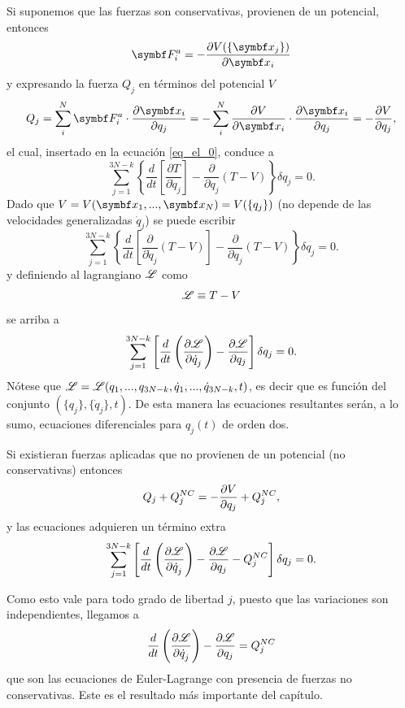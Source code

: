 \documentclass[10pt,oneside]{CBFT_book}
\begin{document}
Si suponemos que las fuerzas son conservativas, provienen de un potencial, entonces 
\[
	\vb{F}_i^a = -\dpar{V(\{ \vb{x}_j \})}{\vb{x}_i}
\]
y expresando la fuerza $Q_j$ en términos del potencial $V$
\[
	Q_j = \sum_i^N \vb{F}_i^a \cdot \dpar{\vb{x}_i}{q_j} = 
	- \sum_i^N \dpar{V}{\vb{x}_i} \cdot \dpar{\vb{x}_i}{q_j} = -\dpar{V}{q_j},
\]
el cual, insertado en la ecuación \eqref{eq_el_0}, conduce a
\[
	\sum_{j=1}^{3N-k} \left\{ \frac{d}{dt}
	\left[ \frac{\partial T}{\partial \dot{q}_j} \right] - \frac{\partial}{\partial q_j} \left( T - V \right) \right\} \delta q_j =  0.
\]
Dado que $ V = V(\vb{x}_1,...,\vb{x}_N) = V( \{ q_j \} )$ (no depende de las velocidades generalizadas $ \dot{q}_j $) se puede escribir 
\[
	\sum_{j=1}^{3N-k} \left\{ \frac{d}{dt}
	\left[ \frac{\partial}{\partial \dot{q}_j} \left( T - V \right) \right] - 
	\frac{\partial}{\partial q_j} \left( T - V \right) \right\} \delta q_j =  0.
\]
y definiendo al lagrangiano $\mathscr{L}$ como 
\[
	\mathscr{L} \equiv T - V
\]
se arriba a
\[
	\sum_{j=1}^{3N-k} \left[
	\frac{d}{dt} \left( \frac{\partial^{\hspace{-0.05em}} {\mathscr{L}}}{\partial {\dot{q}_j}^{\hspace{-0.05em}}} \right) -  \frac{\partial^{\hspace{-0.05em}} {\mathscr{L}}}{\partial {q_j}^{\hspace{-0.05em}}} \right] \delta q_j =  0.
\]
Nótese que $\mathscr{L} = \mathscr{L}( q_1,...,q_{3N-k}, \dot{q}_1, ..., \dot{q}_{3N-k}, t ) $, es decir que es función 
del conjunto $(\{ q_j \}, \{ \dot{q}_j \}, t)$. De esta manera las ecuaciones resultantes serán, a lo sumo,
ecuaciones diferenciales para $q_j(t)$ de orden dos.

Si existieran fuerzas aplicadas que no provienen de un potencial (no conservativas) entonces
\[
	Q_j + Q_j^{NC} = -\frac{\partial^{\hspace{-0.05em}} {V}}{\partial {q_j}^{\hspace{-0.05em}}} + Q_j^{NC},
\]
y las ecuaciones adquieren un término extra 
\[
	\sum_{j=1}^{3N-k} \left[
	\frac{d}{dt} \left( \frac{\partial^{\hspace{-0.05em}} {\mathscr{L}}}{\partial {\dot{q}_j}^{\hspace{-0.05em}}} \right) - \frac{\partial^{\hspace{-0.05em}} {\mathscr{L}}}{\partial {q_j}^{\hspace{-0.05em}}} - Q_j^{NC} \right] \delta q_j = 0.
\]

Como esto vale para todo grado de libertad $j$, puesto que las variaciones son independientes, llegamos a
\[
	\frac{d}{dt} \left( \frac{\partial^{\hspace{-0.05em}} {\mathscr{L}}}{\partial {\dot{q}_j}^{\hspace{-0.05em}}} \right) -  \frac{\partial^{\hspace{-0.05em}} {\mathscr{L}}}{\partial {q_j}^{\hspace{-0.05em}}} = Q_j^{NC}
\]
que son las ecuaciones de Euler-Lagrange con presencia de fuerzas no conservativas. 
Este es el resultado más importante del capítulo.
\end{document}
